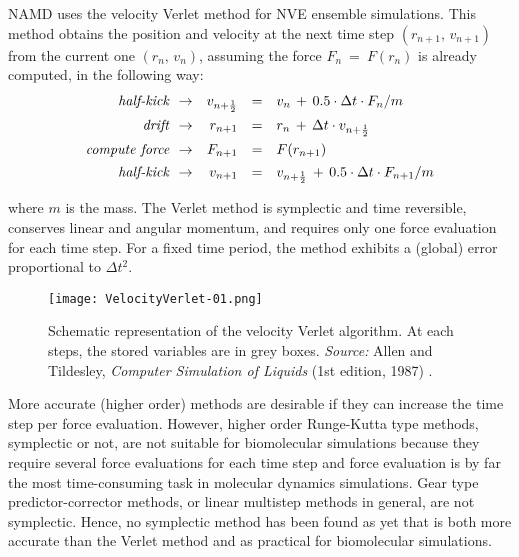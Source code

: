 NAMD uses the velocity Verlet method for NVE ensemble simulations. This  method obtains the position and velocity at the next time step $( r_{n+1} , \, v_{n+1} )$ from the current one $( r_{n} , \, v_{n} )$, assuming the force $F_n \:=\: F(r_n)$ is already computed, in the following way:
\begin{equation*}
\begin{array}{rrcl}
\vspace{0.15cm}
\text{\textit{half-kick  }} \rightarrow &
v_{n + \frac{1}{2}} &= &v_n \,+\, 0.5 \cdot \Delta t \cdot F_n / m\\

\vspace{0.15cm}
\text{\textit{drift  }} \rightarrow& 
r_{n + 1} &= &r_n \,+\, \Delta t \cdot v_{n + \frac{1}{2}}\\

\vspace{0.15cm}
\text{\textit{compute force  }} \rightarrow&
F_{n+1} &= &F(r_{n+1})\\

\vspace{0.15cm}
\text{\textit{half-kick  }} \rightarrow& 
v_{n + 1} &= &v_{n + \frac{1}{2}} \,+\, 0.5 \cdot \Delta t \cdot F_{n + 1} / m\\
\end{array}
\end{equation*}
where $m$ is the mass. The Verlet method is symplectic and time reversible, conserves linear and angular momentum, and requires only one force evaluation for each time step. For a fixed time period, the method exhibits a (global) error proportional to $\Delta t^2$.

\begin{figure}[H]
\centering
\begin{minipage}[t]{0.8\textwidth}
	\centering
    \texttt{[image: VelocityVerlet-01.png]}
    
    \footnotesize{\caption{Schematic representation of the velocity Verlet algorithm. At each steps, the stored variables are in grey boxes.
    \textit{Source:} Allen and Tildesley, \textit{Computer Simulation of Liquids} (1st edition, 1987) 
    \cite{ref:AllenTildesley_1ed}.}
    \label{fig:symplettic-integrator}
    }
\end{minipage} 
\end{figure}

More accurate (higher order) methods are desirable if they can increase the time step per force evaluation. However, higher order Runge-Kutta type methods, symplectic or not, are not suitable for biomolecular simulations because they require several force evaluations for each time step and force evaluation is by far the most time-consuming task in molecular dynamics simulations.
Gear type predictor-corrector methods, or linear multistep methods in general, are not symplectic. Hence, no symplectic method has been found as yet that is both more accurate than the Verlet method and as practical for biomolecular simulations.

